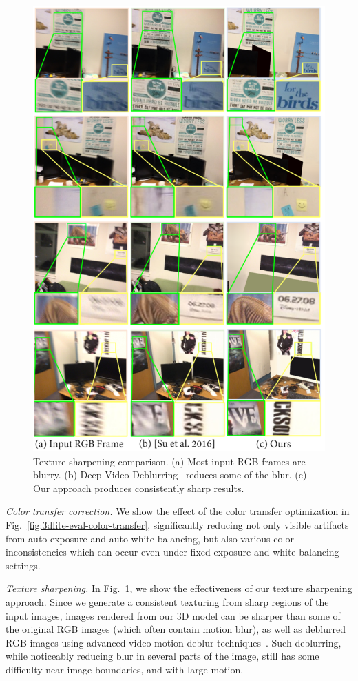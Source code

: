\begin{figure}
\centering
\includegraphics[width=\linewidth,height=1.2\linewidth]{3dlite/fig19.png}
\caption{Texture sharpening comparison. (a) Most input RGB frames are blurry. (b) Deep Video Deblurring~\cite{su2016deep} reduces some of the blur. (c) Our approach produces consistently sharp results.}
\label{fig:3dlite-eval-deblur}
\end{figure}

\emph{Color transfer correction.}
We show the effect of the color transfer optimization in Fig.~\ref{fig:3dlite-eval-color-transfer}, significantly reducing not only visible artifacts from auto-exposure and auto-white balancing, but also various color inconsistencies which can occur even under fixed exposure and white balancing settings.

\emph{Texture sharpening.}
In Fig.~\ref{fig:3dlite-eval-deblur}, we show the effectiveness of our texture sharpening approach.
Since we generate a consistent texturing from sharp regions of the input images, images rendered from our 3D model can be sharper than some of the original RGB images (which often contain motion blur), as well as deblurred RGB images using advanced video motion deblur techniques~\cite{su2016deep}.
Such deblurring, while noticeably reducing blur in several parts of the image, still has some difficulty near image boundaries, and with large motion.


